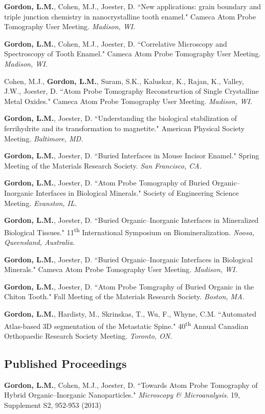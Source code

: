 \textbf{Gordon, L.M.}, Cohen, M.J., Joester, D. ``New applications: grain boundary and triple junction chemistry in nanocrystalline tooth enamel." Cameca Atom Probe Tomography User Meeting. \emph{Madison, WI.}

\textbf{Gordon, L.M.}, Cohen, M.J., Joester, D. ``Correlative Microscopy and Spectroscopy of Tooth Enamel." Cameca Atom Probe Tomography User Meeting. \emph{Madison, WI.}

Cohen, M.J., \textbf{Gordon, L.M.}, Suram, S.K., Kaluskar, K., Rajan, K., Valley, J.W., Joester, D. ``Atom Probe Tomography Reconstruction of Single Crystalline Metal Oxides." Cameca Atom Probe Tomography User Meeting. \emph{Madison, WI.}

\textbf{Gordon, L.M.}, Joester, D. ``Understanding the biological stabilization of ferrihydrite and its transformation to magnetite." American Physical Society Meeting. \emph{Baltimore, MD.}

\textbf{Gordon, L.M.}, Joester, D. ``Buried Interfaces in Mouse Incisor Enamel." Spring Meeting of the Materials Research Society. \emph{San Francisco, CA.}

\textbf{Gordon, L.M.}, Joester, D. ``Atom Probe Tomography of Buried Organic--Inorganic Interfaces in Biological Minerals." Society of Engineering Science Meeting. \emph{Evanston, IL.}

\textbf{Gordon, L.M.}, Joester, D. ``Buried Organic--Inorganic Interfaces in Mineralized Biological Tissues." 11\textsuperscript{th} International Symposium on Biomineralization. \emph{Noosa, Queensland, Australia.}

\textbf{Gordon, L.M.}, Joester, D. ``Buried Organic--Inorganic Interfaces in Biological Minerals." Cameca Atom Probe Tomography User Meeting. \emph{Madison, WI.}

\textbf{Gordon, L.M.}, Joester, D. ``Atom Probe Tomgraphy of Buried Organic in the Chiton Tooth." Fall Meeting of the Materials Research Society. \emph{Boston, MA.}

\textbf{Gordon, L.M.}, Hardisty, M., Skrinskas, T., Wu, F., Whyne, C.M. ``Automated Atlas-based 3D segmentation of the Metastatic Spine." 40\textsuperscript{th} Annual Canadian Orthopaedic Research Society Meeting. \emph{Toronto, ON.}
\endgroup

\subsection*{Published Proceedings}
\textbf{Gordon, L.M.}, Cohen, M.J., Joester, D. ``Towards Atom Probe Tomography of Hybrid Organic--Inorganic Nanoparticles." \emph{Microscopy \& Microanalysis}. 19, Supplement S2, 952-953 (2013)
\begingroup\setlength{\parskip}{0.15cm}

